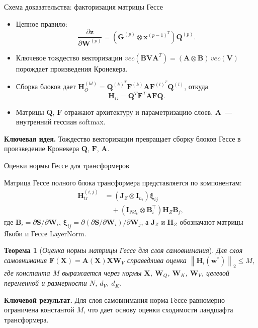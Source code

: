 \documentclass[10pt,pdf,hyperref={unicode}]{beamer}
\newtheorem{rustheorem}{Теорема}
\newcommand{\key}[1]{\textbf{\color{darkgreen}#1}}
\begin{document}
\begin{frame}{Схема доказательства: факторизация матрицы Гессе}
\justifying
\small
\begin{itemize}
    \item Цепное правило:
    \[
        \dfrac{\partial\mathbf{z}}{\partial\mathbf{W}^{(p)}} = \left(\mathbf{G}^{(p)} \otimes \mathbf{x}^{(p-1)^T}\right)\mathbf{Q}^{(p)}.
    \]
    \item Ключевое тождество векторизации $vec(\mathbf{B}\mathbf{V}\mathbf{A}^T) = (\mathbf{A} \otimes \mathbf{B})\,vec(\mathbf{V})$ порождает произведения Кронекера.
    \item Сборка блоков дает $\mathbf{H}_O^{(kl)} = \mathbf{Q}^{(k)^T}\mathbf{F}^{(k)}\mathbf{A}\mathbf{F}^{(l)^T}\mathbf{Q}^{(l)}$, откуда
    \[
        \mathbf{H}_O = \mathbf{Q}^{T}\mathbf{F}^{T}\mathbf{A}\mathbf{F}\mathbf{Q}.
    \]
    \item Матрицы $\mathbf{Q}$, $\mathbf{F}$ отражают архитектуру и параметризацию слоев, $\mathbf{A}$~--- внутренний гессиан softmax.
\end{itemize}

\vspace{0.15em}
\key{Ключевая идея.} Тождество векторизации превращает сборку блоков Гессе в произведение Кронекера $\mathbf{Q}$, $\mathbf{F}$, $\mathbf{A}$.
\end{frame}
\begin{frame}{Оценки нормы Гессе для трансформеров}
\justifying
\small

Матрица Гессе полного блока трансформера представляется по компонентам:
\begin{align*}
    \mathbf{H}_{\mathrm{tr}}^{(i,j)} &= \left( \mathbf{J}_Z \otimes \mathbf{I}_{n_i} \right) \boldsymbol{\xi}_{ij} \\
    &\quad + \left( \mathbf{I}_{N d_V} \otimes \mathbf{B}_i^\top \right) \mathbf{H}_Z \mathbf{B}_j,
\end{align*}
где $\mathbf{B}_i = \partial \mathbf{S} / \partial \mathbf{W}_i$, $\boldsymbol{\xi}_{ij} = \partial (\partial \mathbf{S} / \partial \mathbf{W}_i) / \partial \mathbf{W}_j$, а $\mathbf{J}_Z$ и $\mathbf{H}_Z$ обозначают матрицы Якоби и Гессе LayerNorm.

\begin{rustheorem}[\emph{Оценка нормы матрицы Гессе для слоя самовнимания}]
    \justifying
    Для слоя самовнимания $\mathbf{F}(\mathbf{X}) = \mathbf{A}(\mathbf{X})\mathbf{X}\mathbf{W}_V$ справедлива оценка $\left\|\mathbf{H}_i(\mathbf{w}^*)\right\|_2 \leqslant M$, где константа $M$ выражается через нормы $\mathbf{X}$, $\mathbf{W}_Q$, $\mathbf{W}_K$, $\mathbf{W}_V$, целевой переменной и размерности $N$, $d_V$, $d_K$.
\end{rustheorem}

\vspace{0.15em}
\key{Ключевой результат.} Для слоя самовнимания норма Гессе равномерно ограничена константой $M$, что дает основу оценки сходимости ландшафта трансформера.
\end{frame}
\end{document}
